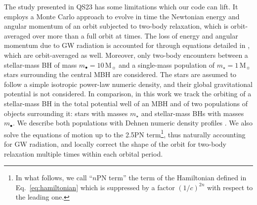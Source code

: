 \documentclass[desactivate]{aa}
\begin{document}
   The study presented in QS23 has some limitations which our code can lift. It employs a Monte Carlo approach to evolve in time the Newtonian energy and angular momentum of an orbit subjected to two-body relaxation, which is orbit-averaged over more than a full orbit at times. The loss of energy and angular momentum due to GW radiation is accounted for through equations detailed in \citet{1964PhRv..136.1224P}, which are orbit-averaged as well. Moreover, only two-body encounters between a stellar-mass BH of mass $m_\bullet = 10 \, \mathrm{M}_\sun$ and a single-mass population of $m_\star = 1 \, \mathrm{M}_\sun$ stars surrounding the central MBH are considered. The stars are assumed to follow a simple isotropic power-law numeric density, and their global gravitational potential is not considered. In comparison, in this work we track the orbiting of a stellar-mass BH in the total potential well of an MBH and of two populations of objects surrounding it: stars with masses $m_\star$ and stellar-mass BHs with masses $m_\bullet$. We describe both populations with Dehnen numeric density profiles \citep{1993MNRAS.265..250D,1994AJ....107..634T}. We also solve the equations of motion up to the 2.5PN term\footnote{In what follows, we call ``$n$PN term'' the term of the Hamiltonian defined in Eq.\ \eqref{eq:hamiltonian} which is suppressed by a factor $(1/c)^{2n}$ with respect to the leading one.}, thus naturally accounting for GW radiation, and locally correct the shape of the orbit for two-body relaxation multiple times within each orbital period.

   
\end{document}
